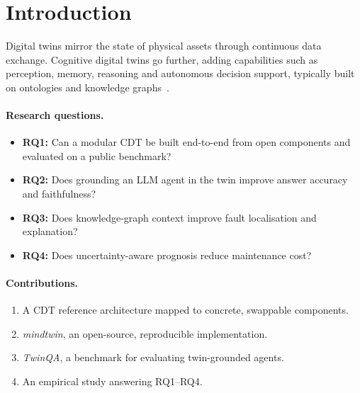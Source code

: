 \section{Introduction}
\label{sec:introduction}

Digital twins mirror the state of physical assets through continuous data exchange. Cognitive
digital twins go further, adding capabilities such as perception, memory, reasoning and
autonomous decision support, typically built on ontologies and knowledge graphs~\citep{zheng2022cdt}.



\paragraph{Research questions.}
\begin{itemize}
  \item \textbf{RQ1:} Can a modular CDT be built end-to-end from open components and evaluated on a public benchmark?
  \item \textbf{RQ2:} Does grounding an LLM agent in the twin improve answer accuracy and faithfulness?
  \item \textbf{RQ3:} Does knowledge-graph context improve fault localisation and explanation?
  \item \textbf{RQ4:} Does uncertainty-aware prognosis reduce maintenance cost?
\end{itemize}

\paragraph{Contributions.}
\begin{enumerate}
  \item A CDT reference architecture mapped to concrete, swappable components.
  \item \emph{mindtwin}, an open-source, reproducible implementation.
  \item \emph{TwinQA}, a benchmark for evaluating twin-grounded agents.
  \item An empirical study answering RQ1--RQ4.
\end{enumerate}
